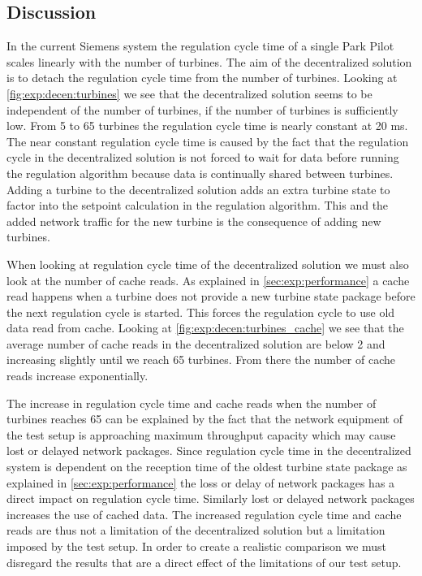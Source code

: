 \subsection{Discussion}
\label{sec:disc:turbinesVScycletime}
In the current Siemens system the regulation cycle time of a single Park Pilot scales linearly with the number of turbines.
The aim of the decentralized solution is to detach the regulation cycle time from the number of turbines. 
Looking at \cref{fig:exp:decen:turbines} we see that the decentralized solution seems to be independent of the number of turbines, if the number of turbines is sufficiently low.
From 5 to 65 turbines the regulation cycle time is nearly constant at 20 ms.
The near constant regulation cycle time is caused by the fact that the regulation cycle in the decentralized solution is not forced to wait for data before running the regulation algorithm because data is continually shared between turbines. Adding a turbine to the decentralized solution adds an extra turbine state to factor into the setpoint calculation in the regulation algorithm. This and the added network traffic for the new turbine is the consequence of adding new turbines.

When looking at regulation cycle time of the decentralized solution we must also look at the number of cache reads.
As explained in \cref{sec:exp:performance} a cache read happens when a turbine does not provide a new turbine state package before the next regulation cycle is started.
This forces the regulation cycle to use old data read from cache.
Looking at \cref{fig:exp:decen:turbines_cache} we see that the average number of cache reads in the decentralized solution are below 2 and increasing slightly until we reach 65 turbines. From there the number of cache reads increase exponentially.

The increase in regulation cycle time and cache reads when the number of turbines reaches 65 can be explained by the fact that the network equipment of the test setup is approaching maximum throughput capacity which may cause lost or delayed network packages.
Since regulation cycle time in the decentralized system is dependent on the reception time of the oldest turbine state package as explained in \cref{sec:exp:performance} the loss or delay of network packages has a direct impact on regulation cycle time.
Similarly lost or delayed network packages increases the use of cached data. The increased regulation cycle time and cache reads are thus not a limitation of the decentralized solution but a limitation imposed by the test setup. In order to create a realistic comparison we must disregard the results that are a direct effect of the limitations of our test setup.

